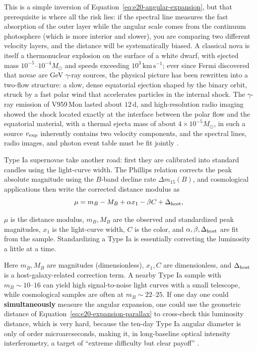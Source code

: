 This is a simple inversion of Equation~\eqref{eq:e20-angular-expansion}, but that prerequisite is where all the risk lies: if the spectral line measures the fast absorption of the outer layer while the angular scale comes from the continuum photosphere (which is more interior and slower), you are comparing two different velocity layers, and the distance will be systematically biased. A classical nova is itself a thermonuclear explosion on the surface of a white dwarf, with ejected mass \(10^{-5}\text{--}10^{-4}M_\odot\) and speeds exceeding \(10^3\,\mathrm{km\,s^{-1}}\); ever since Fermi discovered that novae are GeV \(\gamma\)-ray sources, the physical picture has been rewritten into a two-flow structure: a slow, dense equatorial ejection shaped by the binary orbit, struck by a fast polar wind that accelerates particles in the internal shock. The \(\gamma\)-ray emission of V959\,Mon lasted about \(12\,\mathrm{d}\), and high-resolution radio imaging showed the shock located exactly at the interface between the polar flow and the equatorial material, with a thermal ejecta mass of about \(4\times10^{-5}M_\odot\), in such a source \(v_{\rm exp}\) inherently contains two velocity components, and the spectral lines, radio images, and photon event table must be fit jointly \citep{2014Natur.514..339C,2014Sci...345..554A}.

Type Ia supernovae take another road: first they are calibrated into standard candles using the light-curve width. The Phillips relation corrects the peak absolute magnitude using the \(B\)-band decline rate \(\Delta m_{15}(B)\), and cosmological applications then write the corrected distance modulus as
\begin{equation}
  \mu = m_B - M_B + \alpha x_1-\beta C+\Delta_{\rm host},
  \label{eq:e20-snia-distance-modulus}
\end{equation}
\begin{formulaexplain}
\(\mu\) is the distance modulus, \(m_B,M_B\) are the observed and standardized peak magnitudes, \(x_1\) is the light-curve width, \(C\) is the color, and \(\alpha,\beta,\Delta_{\rm host}\) are fit from the sample. Standardizing a Type Ia is essentially correcting the luminosity a little at a time.
\end{formulaexplain}
Here \(m_B,M_B\) are magnitudes (dimensionless), \(x_1,C\) are dimensionless, and \(\Delta_{\rm host}\) is a host-galaxy-related correction term. A nearby Type Ia sample with \(m_B\sim10\text{--}16\) can yield high signal-to-noise light curves with a small telescope, while cosmological samples are often at \(m_B\sim22\text{--}25\). If one day one could \textbf{simultaneously} measure the angular expansion, one could use the geometric distance of Equation~\eqref{eq:e20-expansion-parallax} to cross-check this luminosity distance, which is very hard, because the ten-day Type Ia angular diameter is only of order microarcseconds, making it, in long-baseline optical intensity interferometry, a target of ``extreme difficulty but clear payoff'' \citep{1993ApJ...413L.105P,1998AJ....116.1009R,1999ApJ...517..565P}.

